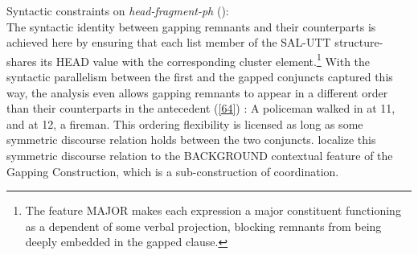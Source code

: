 { \ea
\label{gap-hf-con}
Syntactic constraints on {\it head-fragment-ph} (\citealt[(53)]{Abeille2014}):\\
 \impl
{}
\z
 The syntactic identity between gapping remnants and their counterparts is achieved here by ensuring that each list member of the SAL-UTT structure-shares 
its HEAD value with the corresponding cluster element.\footnote{The feature MAJOR makes each expression a major constituent functioning as a dependent of some verbal projection, blocking
remnants from being deeply embedded in the gapped clause.}
   With the syntactic parallelism between the first and
   the gapped conjuncts captured this way, the analysis even allows 
    gapping remnants to appear in a different order than their counterparts in the antecedent (\ref{64}) \citep[see][156--158]{Sag1985}:
%
\ea A policeman walked in at 11, and at 12, a fireman. \label{64}\z
%
%
This ordering flexibility is licensed as long as some symmetric discourse relation holds between the two conjuncts. \citet{Abeille2014} 
localize this symmetric discourse relation to the BACKGROUND contextual feature of the Gapping Construction, which is a sub-construction of coordination. %

\iffalse{
\citet{Abeille2014} offer additional evidence from Romance (e.g., case mismatch between gapping remnants and their counterparts and even more possibilities of ordering remnants than is the case in English) to strengthen their point that syntactic identity is relaxed under gapping.

There are three further key assumptions in Abeill\'{e} et al.'s (2014) analysis. First, two (or more) gapping remnants form a cluster whose mother has an underspecified syntactic category, that is, is a non-headed phrase (this information is represented by the Cluster head feature in \ref{66}). This phrase then serves as the head daughter of a head-fragment phrase, whose syntactic category is also underspecified. This means that there is no unpronounced verbal head in the phrase to which gapping remnants belong. Second, the meanings of the gapping remnants are computed from the meaning of the rightmost nonelliptical verbal conjunct, as represented by the Source feature in \ref{66}. Finally, the conjuncts are linked by a symmetric discourse relation (i.e.,  parallelism or contrast) that is part of the Background feature in \ref{66}.
}\fi



}
